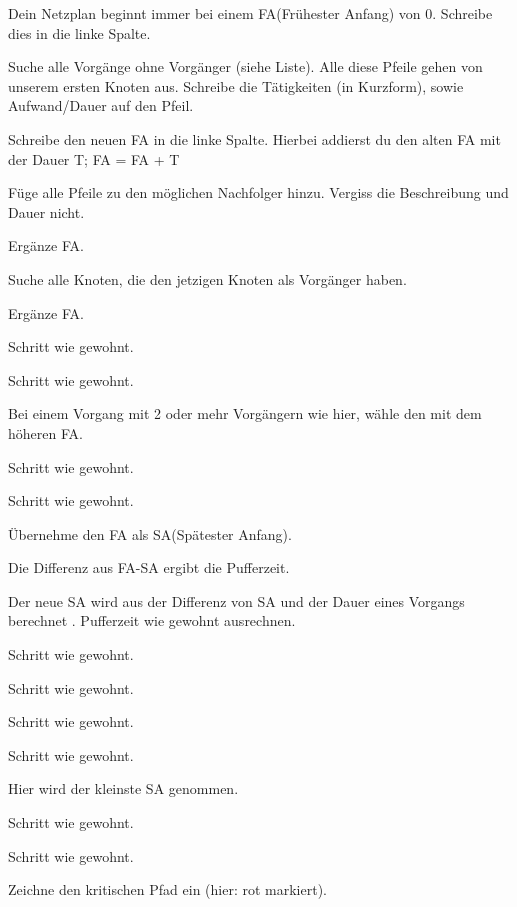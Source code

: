\documentclass{beamer}
\begin{document}
\begin{frame}[t,shrink=65]
\begin{columns}
\par\vspace{1cm}\noindent %
\begin{itemize}

{\huge
    \item<only@+> {Dein Netzplan beginnt immer bei einem FA(Frühester Anfang) von 0. Schreibe dies in die linke Spalte.}

    \item<only@+> {Suche alle Vorgänge ohne Vorgänger (siehe Liste). Alle diese Pfeile gehen von unserem ersten Knoten aus. Schreibe die Tätigkeiten (in Kurzform), sowie Aufwand/Dauer auf den Pfeil.}
    \item<only@+> {Schreibe den neuen FA in die linke Spalte. Hierbei addierst du den alten FA mit der Dauer T;
                   FA = FA + T}
    \item<only@+> {Füge alle Pfeile zu den möglichen Nachfolger hinzu. Vergiss die Beschreibung und Dauer nicht.}
    \item<only@+> {Ergänze FA.}
    \item<only@+> {Suche alle Knoten, die den jetzigen Knoten als Vorgänger haben.}
    \item<only@+> {Ergänze FA.}
    \item<only@+> {Schritt wie gewohnt.}
    \item<only@+> {Schritt wie gewohnt.}
    \item<only@+> {Bei einem Vorgang mit 2 oder mehr Vorgängern wie hier, wähle den mit dem höheren FA.}
    \item<only@+> {Schritt wie gewohnt.}
    \item<only@+> {Schritt wie gewohnt.}
    \item<only@+> {Übernehme den FA als SA(Spätester Anfang).}
    \item<only@+> {Die Differenz aus FA-SA ergibt die Pufferzeit.}
    \item<only@+> {Der neue SA wird aus der Differenz von SA und der Dauer eines Vorgangs berechnet . Pufferzeit wie gewohnt ausrechnen.}
    \item<only@+> {Schritt wie gewohnt.}
    \item<only@+> {Schritt wie gewohnt.}
    \item<only@+> {Schritt wie gewohnt.}
    \item<only@+> {Schritt wie gewohnt.}
    \item<only@+> {Hier wird der kleinste SA genommen.}
    \item<only@+> {Schritt wie gewohnt.}
    \item<only@+> {Schritt wie gewohnt.}
    \item<only@+> {Zeichne den kritischen Pfad ein (hier: rot markiert).}
    \item \alert<+> {}
}


\end{itemize}
\end{columns}
\end{frame}
\end{document}
